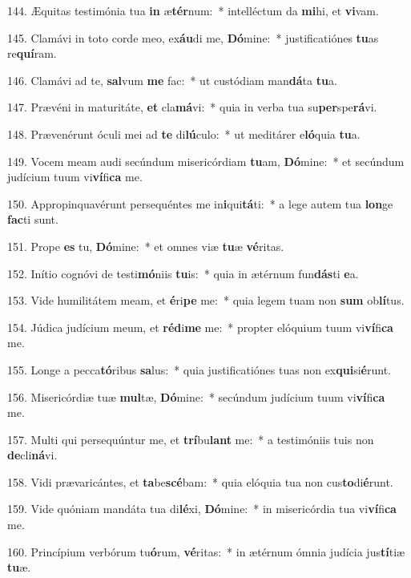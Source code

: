 144. Æquitas testimónia tua \textbf{in} æ\textbf{tér}num:~*  intelléctum da \textbf{mi}hi, et \textbf{vi}vam.\

145. Clamávi in toto corde meo, ex\textbf{áu}di me, \textbf{Dó}mine:~*  justificatiónes \textbf{tu}as re\textbf{quí}ram.\

146. Clamávi ad te, \textbf{sal}vum \textbf{me} fac:~*  ut custódiam man\textbf{dá}ta \textbf{tu}a.\

147. Prævéni in maturitáte, \textbf{et} cla\textbf{má}vi:~*  quia in verba tua su\textbf{per}spe\textbf{rá}vi.\

148. Prævenérunt óculi mei ad \textbf{te} di\textbf{lú}culo:~*  ut meditárer e\textbf{ló}quia \textbf{tu}a.\

149. Vocem meam audi secúndum misericórdiam \textbf{tu}am, \textbf{Dó}mine:~*  et secúndum judícium tuum vi\textbf{ví}fi\textbf{ca} me.\

150. Appropinquavérunt persequéntes me in\textbf{i}qui\textbf{tá}ti:~*  a lege autem tua \textbf{lon}ge \textbf{fac}ti sunt.\

151. Prope \textbf{es} tu, \textbf{Dó}mine:~*  et omnes viæ \textbf{tu}æ \textbf{vé}ritas.\

152. Inítio cognóvi de testi\textbf{mó}niis \textbf{tu}is:~*  quia in ætérnum fun\textbf{dás}ti \textbf{e}a.\

153. Vide humilitátem meam, et \textbf{é}ri\textbf{pe} me:~*  quia legem tuam non \textbf{sum} ob\textbf{lí}tus.\

154. Júdica judícium meum, et \textbf{réd}i\textbf{me} me:~*  propter elóquium tuum vi\textbf{ví}fi\textbf{ca} me.\

155. Longe a pecca\textbf{tó}ribus \textbf{sa}lus:~*  quia justificatiónes tuas non ex\textbf{qui}si\textbf{é}runt.\

156. Misericórdiæ tuæ \textbf{mul}tæ, \textbf{Dó}mine:~*  secúndum judícium tuum vi\textbf{ví}fi\textbf{ca} me.\

157. Multi qui persequúntur me, et \textbf{trí}bu\textbf{lant} me:~*  a testimóniis tuis non \textbf{de}cli\textbf{ná}vi.\

158. Vidi prævaricántes, et \textbf{ta}be\textbf{scé}bam:~*  quia elóquia tua non cus\textbf{to}di\textbf{é}runt.\

159. Vide quóniam mandáta tua di\textbf{lé}xi, \textbf{Dó}mine:~*  in misericórdia tua vi\textbf{ví}fi\textbf{ca} me.\

160. Princípium verbórum tu\textbf{ó}rum, \textbf{vé}ritas:~*  in ætérnum ómnia judícia jus\textbf{tí}tiæ \textbf{tu}æ.\

